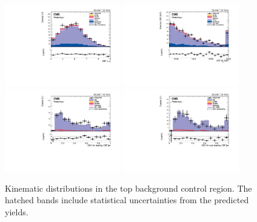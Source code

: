 \begin{figure}[!htbp]
\includegraphics[width=0.45\textwidth]{Plots/plots/DibosonBoostedElMuCuts13TeV_TTBarControlRegion_CHS_vbf_maxpt_jj_Deta.pdf}
\includegraphics[width=0.45\textwidth]{Plots/plots/DibosonBoostedElMuCuts13TeV_TTBarControlRegion_CHS_vbf_maxpt_jj_m.pdf}
\includegraphics[width=0.45\textwidth]{Plots/plots/DibosonBoostedElMuCuts13TeV_TTBarControlRegion_CHS_vbf_maxpt_j1_bDiscriminatorCSV.pdf}
\includegraphics[width=0.45\textwidth]{Plots/plots/DibosonBoostedElMuCuts13TeV_TTBarControlRegion_CHS_vbf_maxpt_j2_bDiscriminatorCSV.pdf}
\caption{Kinematic distributions in the top background control region. The hatched bands include statistical uncertainties from the predicted yields.}
\label{fig:top_control}
\end{figure}


